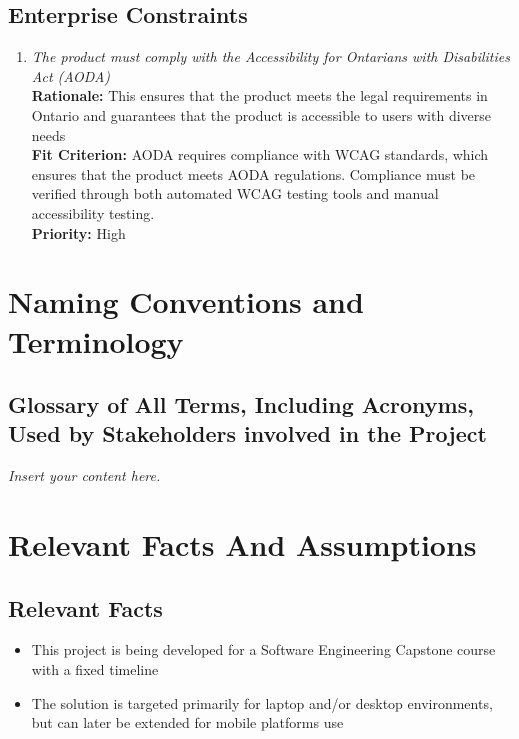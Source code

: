 \documentclass[12pt]{article}
\newcommand{\lips}{\textit{Insert your content here.}}
\begin{document}
\subsection{Enterprise Constraints}
\begin{enumerate}[label=MD-EC \arabic*., wide=0pt, leftmargin=*]
  \item \emph{The product must comply with the Accessibility for Ontarians with Disabilities Act (AODA)}\\[2mm]
    {\bf Rationale:} This ensures that the product meets the legal requirements in Ontario and guarantees that 
    the product is accessible to users with diverse needs\\
    {\bf Fit Criterion:} AODA requires compliance with WCAG standards, which ensures that the product meets AODA regulations. 
    Compliance must be verified through both automated WCAG testing tools and manual accessibility testing.\\
    {\bf Priority:} High
\end{enumerate}

\section{Naming Conventions and Terminology}
\subsection{Glossary of All Terms, Including Acronyms, Used by Stakeholders
involved in the Project}
\lips

\section{Relevant Facts And Assumptions}
\subsection{Relevant Facts}
\begin{itemize}
  \item This project is being developed for a Software Engineering Capstone course with a fixed timeline
  \item The solution is targeted primarily for laptop and/or desktop environments, but can later be extended for mobile platforms use
\end{itemize}
\end{document}
